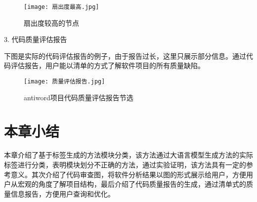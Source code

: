 \begin{figure}[h]
\centering
\texttt{[image: 扇出度最高.jpg]}
\caption{扇出度较高的节点}
\end{figure}


3. 代码质量评估报告

下图是实际的代码评估报告的例子，由于报告过长，这里只展示部分信息。通过代码评估报告，用户能以清单的方式了解软件项目的所有质量缺陷。

\begin{figure}[h]
\centering
\texttt{[image: 质量评估报告.jpg]}
\caption{antiword项目代码质量评估报告节选}
\end{figure}



\section{本章小结}

本章介绍了基于标签生成的方法模块分类，该方法通过大语言模型生成方法的实际标签进行分类，表明模块划分不正确的方法，通过实验证明，该方法具有一定的参考意义。其次介绍了代码审查图，将软件分析结果以图的形式展示给用户，方便用户从宏观的角度了解项目结构，最后介绍了代码质量报告的生成，通过清单式的质量信息报告，方便用户查询和优化。





